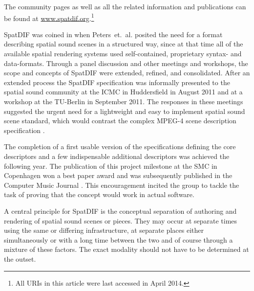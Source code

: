 \documentclass{article}
\begin{document}
The community pages as well as all the related information and publications can be found at \href{http://www.spatdif.org}{www.spatdif.org}.\footnote{All URIs in this article were last accessed in April 2014.}



SpatDIF was coined in \citeyear{peters_caa07} \cite{peters_caa07} when Peters~et.~al. posited the need for a format describing spatial sound scenes in a structured way, since at that time all of the available spatial rendering systems used self-contained, proprietary syntax- and data-formats.
Through a panel discussion \cite{2008ICMCpanel, Peters:2008spatdif} and other meetings and workshops, the scope and concepts of SpatDIF were extended, refined, and consolidated.
After an extended process the SpatDIF specification was informally presented to the spatial sound community at the ICMC in Huddersfield in August 2011 and at a workshop at the TU-Berlin in September 2011.
The responses in these meetings suggested the urgent need for a lightweight and easy to implement spatial sound scene standard, which would contrast the complex MPEG-4 scene description specification \cite{scheirer1999audiobifs}.

The completion of a first usable version of the specifications \cite{SpatDIF_03} defining the core descriptors and a few indispensable additional descriptors was achieved the following year. The publication of this project milestone at the SMC in Copenhagen \cite{SpatDIF_SMC12} won a best paper award and was subsequently published in the Computer Music Journal \cite{Peters:2013SpatDifCMJ}.
This encouragement incited the group to tackle the task of proving that the concept would work in actual software.


A central principle for SpatDIF is the conceptual separation of authoring and rendering of spatial sound scenes or pieces. They may occur at separate times using the same or differing infrastructure, at separate places either simultaneously or with a long time between the two and of course through a mixture of these factors. 
The exact modality should not have to be determined at the outset.
\end{document}
